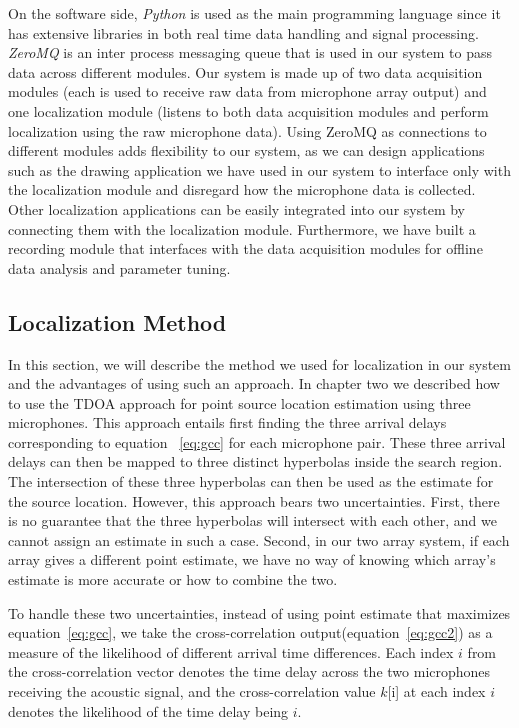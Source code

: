 On the software side, \emph{Python} is used as the main programming language since it has extensive libraries in both real time data handling and signal processing. \emph{ZeroMQ} is an inter process messaging queue that is used in our system to pass data across different modules. Our system is made up of two data acquisition modules (each is used to receive raw data from microphone array output) and one localization module (listens to both data acquisition modules and perform localization using the raw microphone data). Using ZeroMQ as connections to different modules adds flexibility to our system, as we can design applications such as the drawing application we have used in our system to interface only with the localization module and disregard how the microphone data is collected. Other localization applications can be easily integrated into our system by connecting them with the localization module. Furthermore, we have built a recording module that interfaces with the data acquisition modules for offline data analysis and parameter tuning. 

\subsection{Localization Method}
In this section, we will describe the method we used for localization in our system and the advantages of using such an approach. In chapter two we described how to use the TDOA approach for point source location estimation using three microphones. This approach entails first finding the three arrival delays corresponding to equation ~\ref{eq:gcc} for each microphone pair. These three arrival delays can then be mapped to three distinct hyperbolas inside the search region. The intersection of these three hyperbolas can then be used as the estimate for the source location. However, this approach bears two uncertainties. First, there is no guarantee that the three hyperbolas will intersect with each other, and we cannot assign an estimate in such a case. Second, in our two array system, if each array gives a different point estimate, we have no way of knowing which array's estimate is more accurate or how to combine the two.       

To handle these two uncertainties, instead of using point estimate that maximizes equation~\ref{eq:gcc}, we take the cross-correlation output(equation~\ref{eq:gcc2}) as a measure of the likelihood of different arrival time differences. Each index $i$ from the cross-correlation vector denotes the time delay across the two microphones receiving the acoustic signal, and the cross-correlation value $k$[i] at each index $i$ denotes the likelihood of the time delay being $i$. 

